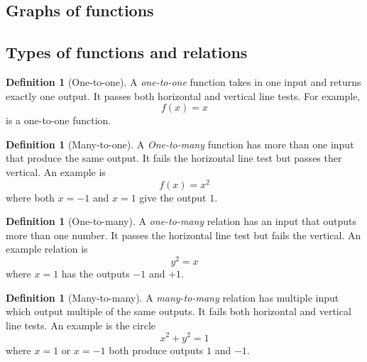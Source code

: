\documentclass[12pt]{book}
\theoremstyle{definition}
\newtheorem{defi}[theo]{Definition}
\begin{document}
\subsection{Graphs of functions}
\subsection{Types of functions and relations}
  \begin{defi}[One-to-one]
    A \textit{one-to-one} function takes in one input and returns exactly one output. It passes both
    horizontal and vertical line tests. For example, \[f(x)=x\] is a one-to-one function.
  \end{defi}
  \begin{defi}[Many-to-one]
    A \textit{One-to-many} function has more than one input that produce the same output. It fails
    the horizontal line test but passes ther vertical. An example is \[f(x)=x^2\] where both $x=-1$ and $x=1$ give the
    output $1$.
  \end{defi}
  \begin{defi}[One-to-many]
    A \textit{one-to-many} relation has an input that outputs more than one number. It passes the horizontal line test but
    fails the vertical. An example relation is \[y^2=x\] where $x=1$ has the outputs $-1$ and $+1$. 
  \end{defi}
  \begin{defi}[Many-to-many]
    A \textit{many-to-many} relation has multiple input which output multiple of the same outputs. It fails both horizontal 
    and vertical line tests. An example is the circle \[x^2+y^2=1\] where $x=1$ or $x=-1$ both produce outputs $1$ and $-1$.
  \end{defi}
\end{document}
